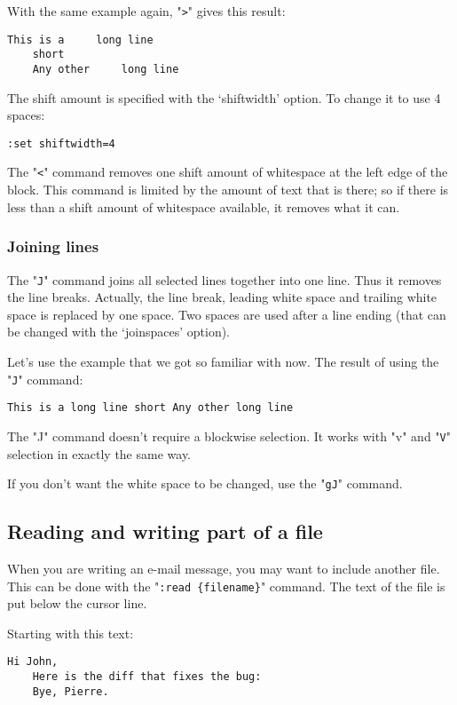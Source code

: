 With the same example again, "\verb!>!" gives this result:

\begin{Verbatim}[samepage=true]
    This is a     long line 
    short 
    Any other     long line 
\end{Verbatim}

The shift amount is specified with the `shiftwidth' option.
To change it to use 4 spaces:

\begin{Verbatim}[samepage=true]
 :set shiftwidth=4
\end{Verbatim}

The "\verb!<!" command removes one shift amount of whitespace at the left edge of the block.
This command is limited by the amount of text that is there; so if there is less than a shift amount of whitespace available, it removes what it can.


\subsubsection{Joining lines}
The "\verb!J!" command joins all selected lines together into one line.
Thus it removes the line breaks.
Actually, the line break, leading white space and trailing white space is replaced by one space.
Two spaces are used after a line ending (that can be changed with the `joinspaces' option).

Let's use the example that we got so familiar with now.
The result of using the "\verb!J!" command:

\begin{Verbatim}[samepage=true]
    This is a long line short Any other long line 
\end{Verbatim}

The "J" command doesn't require a blockwise selection.
It works with "v" and "\verb!V!" selection in exactly the same way.

If you don't want the white space to be changed, use the "\verb!gJ!" command.
\subsection{Reading and writing part of a file}
When you are writing an e-mail message, you may want to include another file.
This can be done with the "\verb!:read {filename}!" command.
The text of the file is put below the cursor line.

Starting with this text:

\begin{Verbatim}[samepage=true]
    Hi John, 
    Here is the diff that fixes the bug: 
    Bye, Pierre. 
\end{Verbatim}

